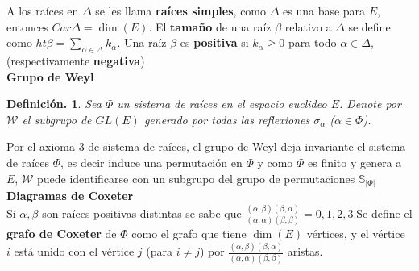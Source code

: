 \documentclass[11pt,a4paper]{article}
\newtheorem{definition}{Definici\'on.}
\begin{document}
A los raíces en $\Delta$ se les llama \textbf{raíces simples}, como $\Delta$ es una base para $E$, entonces $Car \Delta = \dim (E)$. El \textbf{tamaño} de una raíz $\beta$ relativo a $\Delta$ se define como $ht\beta= \sum_{\alpha\in \Delta}k_{\alpha}$. Una raíz $\beta$ es \textbf{positiva} si $k_{\alpha}\geq 0$ para todo $\alpha \in \Delta$, (respectivamente \textbf{negativa})
\\
\textbf{Grupo de Weyl}\\
\begin{definition}
Sea $\Phi$ un sistema de raíces en el espacio euclideo $E$. Denote por $\mathcal{W}$ el subgrupo de $GL(E)$ generado por todas las reflexiones $\sigma_{\alpha}$ ($\alpha \in \Phi$).
\end{definition}
Por el axioma 3  de sistema de raíces, el grupo de Weyl deja invariante el sistema de raíces $\Phi$, es decir induce una permutación en $\Phi$ y como $\Phi$ es finito y genera a $E$, $\mathcal{W}$ puede identificarse con un subgrupo del grupo de permutaciones $\mathbb{S}_{|\Phi|}$ \\

\textbf{Diagramas de Coxeter} \\
Si $\alpha, \beta$ son raíces positivas distintas se sabe que $\frac{(\alpha, \beta)(\beta, \alpha)}{(\alpha, \alpha)(\beta,\beta)}=0,1,2,3$.Se define el \textbf{grafo de Coxeter} de $\Phi$ como el grafo que tiene $\dim(E)$ vértices,  y el vértice $i$ está unido con el vértice $j$ (para $i\neq j$) por $\frac{(\alpha, \beta)(\beta, \alpha)}{(\alpha, \alpha)(\beta,\beta)}$ aristas.\\
\end{document}
